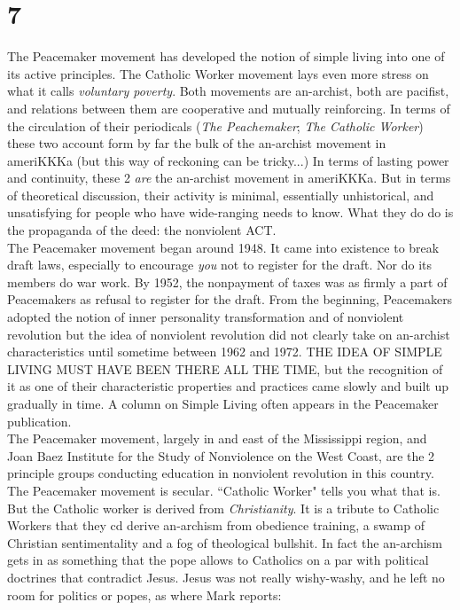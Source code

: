 \documentclass[12pt, onecolumn, letterpaper, oneside]{book}
\begin{document}
\section*{7}
The Peacemaker movement has developed the notion of simple living into one of its active principles. The Catholic Worker movement lays even more stress on what it calls \emph{voluntary poverty}. Both movements are an-archist, both are pacifist, and relations between them are cooperative and mutually reinforcing. In terms of the circulation of their periodicals (\emph{The Peachemaker}; \emph{The Catholic Worker}) these two account form by far the bulk of the an-archist movement in ameriKKKa (but this way of reckoning can be tricky...) In terms of lasting power and continuity, these 2 \emph{are} the an-archist movement in ameriKKKa. But in terms of theoretical discussion, their activity is minimal, essentially unhistorical, and unsatisfying for people who have wide-ranging needs to know. What they do do is the propaganda of the deed: the nonviolent ACT.\\
The Peacemaker movement began around 1948. It came into existence to break draft laws, especially to encourage \emph{you} not to register for the draft. Nor do its members do war work. By 1952, the nonpayment of taxes was as firmly a part of Peacemakers as refusal to register for the draft. From the beginning, Peacemakers adopted the notion of inner personality transformation and of nonviolent revolution but the idea of nonviolent revolution did not clearly take on an-archist characteristics until sometime between 1962 and 1972. THE IDEA OF SIMPLE LIVING MUST HAVE BEEN THERE ALL THE TIME, but the recognition of it as one of their characteristic properties and practices came slowly and built up gradually in time. A column on Simple Living often appears in the Peacemaker publication.\\
The Peacemaker movement, largely in and east of the Mississippi region, and Joan Baez Institute for the Study of Nonviolence on the West Coast, are the 2 principle groups conducting education in nonviolent revolution in this country.\\
The Peacemaker movement is secular. ``Catholic Worker" tells you what that is. But the Catholic worker is derived from \emph{Christianity}. It is a tribute to Catholic Workers that they cd derive an-archism from obedience training, a swamp of Christian sentimentality and a fog of theological bullshit. In fact the an-archism gets in as something that the pope allows to Catholics on a par with political doctrines that contradict Jesus. Jesus was not really wishy-washy, and he left no room for politics or popes, as where Mark reports:
\end{document}
